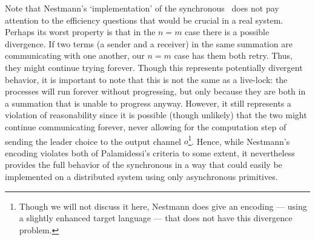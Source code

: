 Note that Nestmann's `implementation' of the synchronous \picalc\ does not pay attention to the efficiency questions that would be crucial in a real system.  Perhaps its worst property is that in the $n=m$ case there is a possible divergence.  If two terms (a sender and a receiver) in the same summation are communicating with one another, our $n=m$ case has them both retry.  Thus, they might continue trying forever.  Though this represents potentially divergent behavior, it is important to note that this is not the same as a live-lock: the processes will run forever without progressing, but only because they are both in a summation that is unable to progress anyway.  However, it still represents a violation of reasonability since it is possible (though unlikely) that the two might continue communicating forever, never allowing for the computation step of sending the leader choice to the output channel $o$\footnote{Though we will not discuss it here, Nestmann \cite{nestm00} does give an encoding --- using a slightly enhanced target language --- that does not have this divergence problem.}.  Hence, while Nestmann's encoding violates both of Palamidessi's criteria to some extent, it nevertheless provides the full behavior of the synchronous in a way that could easily be implemented on a distributed system using only asynchronous primitives.